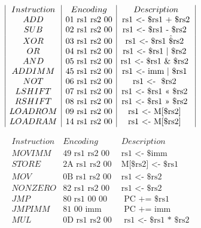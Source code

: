 \documentclass[12pt]{beamer}
\begin{document}
\begin{frame}
   \[
        \begin{array}{|c|c|c|}
            Instruction&  Encoding & Description \\
            ADD         & \text{01 rs1 rs2 00} & \text{rs1 <- \$rs1 + \$rs2} \\
            SUB         & \text{02 rs1 rs2 00} & \text{rs1 <- \$rs1 - \$rs2 } \\
            XOR         & \text{03 rs1 rs2 00} & \text{rs1 <- \$rs1 \^ \$rs2 } \\
            OR         & \text{04 rs1 rs2 00} & \text{rs1 <- \$rs1 | \$rs2 } \\
            AND         & \text{05 rs1 rs2 00} & \text{rs1 <- \$rs1 \& \$rs2 } \\
            ADDIMM       & \text{45 rs1 rs2 00} & \text{rs1 <- imm | \$rs1 } \\
            NOT         & \text{06 rs1 rs2 00} & \text{rs1 <- ~\$rs2 } \\
            LSHIFT      & \text{07 rs1 rs2 00} & \text{rs1 <- \$rs1 << \$rs2 } \\
            RSHIFT      & \text{08 rs1 rs2 00} & \text{rs1 <- \$rs1 >> \$rs2 } \\
            LOADROM      & \text{09 rs1 rs2 00} & \text{rs1 <- M[\$rs2] } \\
            LOADRAM      & \text{14 rs1 rs2 00} & \text{rs1 <- M[\$rs2] } \\
        \end{array}
    \]
\end{frame}

\begin{frame}
    \[
         \begin{array}{|c|c|c|}
             Instruction&  Encoding & Description \\
             MOVIMM         & \text{49 rs1 rs2 00} & \text{rs1 <- \$imm} \\
             STORE         & \text{2A rs1 rs2 00} & \text{M[\$rs2] <- \$rs1} \\
             MOV         & \text{0B rs1 rs2 00} & \text{rs1 <- \$rs2 } \\
             NONZERO     & \text{82 rs1 rs2 00} & \text{rs1 <- \$rs2 } \\
             JMP         & \text{80 rs1 00 00} & \text{ PC += \$rs1 } \\
             JMPIMM       & \text{81 00 imm } & \text{ PC += imm} \\
            MUL       & \text{0D rs1 rs2 00 } & \text{ rs1 <- \$rs1 * \$rs2} \\

         \end{array}
     \]
 \end{frame}
\end{document}
